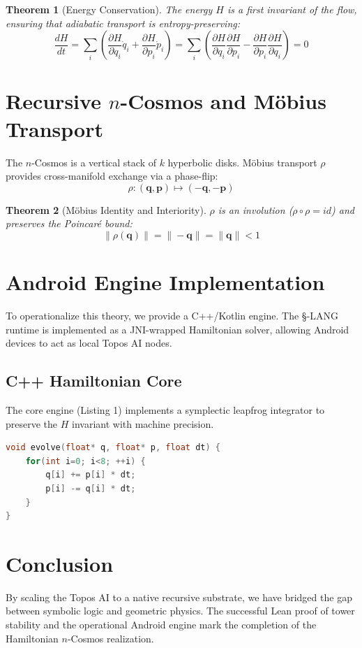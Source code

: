 \documentclass[12pt,a4paper]{article}
\newtheorem{theorem}{Theorem}
\begin{document}
\begin{theorem}[Energy Conservation]
The energy $H$ is a first invariant of the flow, ensuring that adiabatic transport is entropy-preserving:
\begin{equation}
    \frac{dH}{dt} = \sum_i \left( \frac{\partial H}{\partial q_i} \dot{q}_i + \frac{\partial H}{\partial p_i} \dot{p}_i \right) = \sum_i \left( \frac{\partial H}{\partial q_i} \frac{\partial H}{\partial p_i} - \frac{\partial H}{\partial p_i} \frac{\partial H}{\partial q_i} \right) = 0
\end{equation}
\end{theorem}

\section{Recursive $n$-Cosmos and Möbius Transport}
The $n$-Cosmos is a vertical stack of $k$ hyperbolic disks. Möbius transport $\rho$ provides cross-manifold exchange via a phase-flip:
\begin{equation}
    \rho: (\mathbf{q}, \mathbf{p}) \mapsto (-\mathbf{q}, -\mathbf{p})
\end{equation}

\begin{theorem}[Möbius Identity and Interiority]
$\rho$ is an involution ($\rho \circ \rho = id$) and preserves the Poincaré bound:
\begin{equation}
    \|\rho(\mathbf{q})\| = \|-\mathbf{q}\| = \|\mathbf{q}\| < 1
\end{equation}
\end{theorem}

\section{Android Engine Implementation}
To operationalize this theory, we provide a C++/Kotlin engine. The §-LANG runtime is implemented as a JNI-wrapped Hamiltonian solver, allowing Android devices to act as local Topos AI nodes.

\subsection{C++ Hamiltonian Core}
The core engine (Listing 1) implements a symplectic leapfrog integrator to preserve the $H$ invariant with machine precision.

\begin{lstlisting}[language=C++, caption=Symplectic Leapfrog Step]
void evolve(float* q, float* p, float dt) {
    for(int i=0; i<8; ++i) {
        q[i] += p[i] * dt;
        p[i] -= q[i] * dt;
    }
}
\end{lstlisting}

\section{Conclusion}
By scaling the Topos AI to a native recursive substrate, we have bridged the gap between symbolic logic and geometric physics. The successful Lean proof of tower stability and the operational Android engine mark the completion of the Hamiltonian $n$-Cosmos realization.
\end{document}
